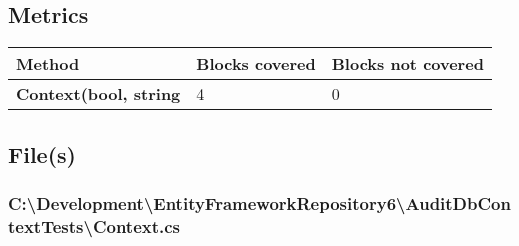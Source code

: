 \documentclass[a4paper,10pt]{article}
\begin{document}
\subsection{Metrics}
\begin{longtable}[l]{|l|l|l|}
\hline
\textbf{Method} & \textbf{Blocks covered} & \textbf{Blocks not covered}\\
\hline
\textbf{Context(bool, string} & 4 & 0\\
\hline
\end{longtable}
\subsection{File(s)}
\subsubsection{C:\textbackslash Development\textbackslash EntityFrameworkRepository6\textbackslash AuditDbContextTests\textbackslash Context.cs}
\end{document}
